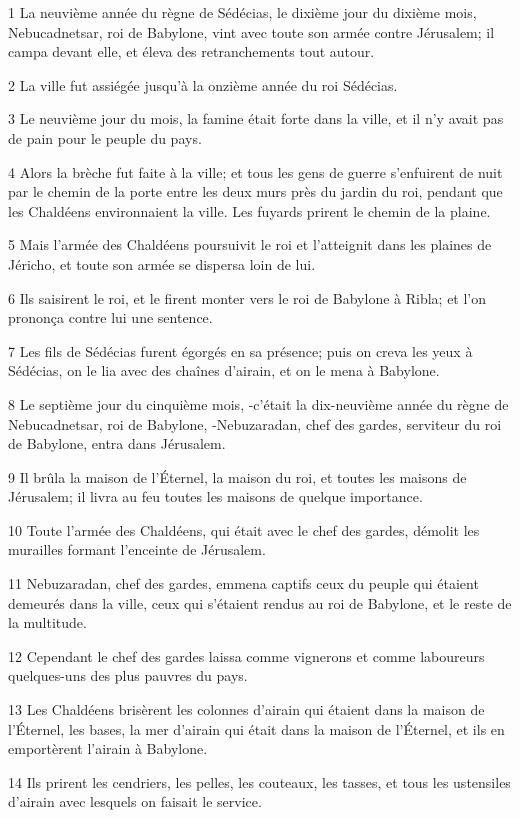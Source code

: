\par 1 La neuvième année du règne de Sédécias, le dixième jour du dixième mois, Nebucadnetsar, roi de Babylone, vint avec toute son armée contre Jérusalem; il campa devant elle, et éleva des retranchements tout autour.
\par 2 La ville fut assiégée jusqu'à la onzième année du roi Sédécias.
\par 3 Le neuvième jour du mois, la famine était forte dans la ville, et il n'y avait pas de pain pour le peuple du pays.
\par 4 Alors la brèche fut faite à la ville; et tous les gens de guerre s'enfuirent de nuit par le chemin de la porte entre les deux murs près du jardin du roi, pendant que les Chaldéens environnaient la ville. Les fuyards prirent le chemin de la plaine.
\par 5 Mais l'armée des Chaldéens poursuivit le roi et l'atteignit dans les plaines de Jéricho, et toute son armée se dispersa loin de lui.
\par 6 Ils saisirent le roi, et le firent monter vers le roi de Babylone à Ribla; et l'on prononça contre lui une sentence.
\par 7 Les fils de Sédécias furent égorgés en sa présence; puis on creva les yeux à Sédécias, on le lia avec des chaînes d'airain, et on le mena à Babylone.
\par 8 Le septième jour du cinquième mois, -c'était la dix-neuvième année du règne de Nebucadnetsar, roi de Babylone, -Nebuzaradan, chef des gardes, serviteur du roi de Babylone, entra dans Jérusalem.
\par 9 Il brûla la maison de l'Éternel, la maison du roi, et toutes les maisons de Jérusalem; il livra au feu toutes les maisons de quelque importance.
\par 10 Toute l'armée des Chaldéens, qui était avec le chef des gardes, démolit les murailles formant l'enceinte de Jérusalem.
\par 11 Nebuzaradan, chef des gardes, emmena captifs ceux du peuple qui étaient demeurés dans la ville, ceux qui s'étaient rendus au roi de Babylone, et le reste de la multitude.
\par 12 Cependant le chef des gardes laissa comme vignerons et comme laboureurs quelques-uns des plus pauvres du pays.
\par 13 Les Chaldéens brisèrent les colonnes d'airain qui étaient dans la maison de l'Éternel, les bases, la mer d'airain qui était dans la maison de l'Éternel, et ils en emportèrent l'airain à Babylone.
\par 14 Ils prirent les cendriers, les pelles, les couteaux, les tasses, et tous les ustensiles d'airain avec lesquels on faisait le service.

